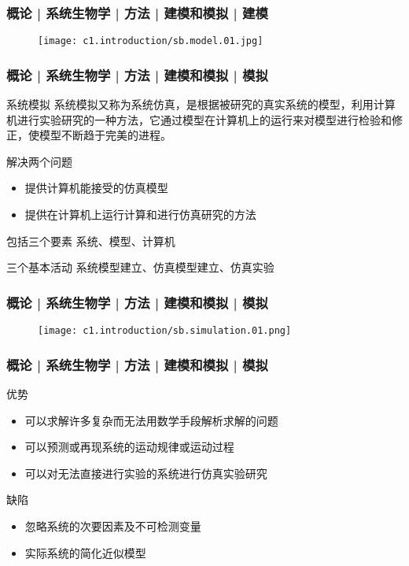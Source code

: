 \begin{frame}
  \frametitle{概论 | 系统生物学 | 方法 | 建模和模拟 | 建模}
  \begin{figure}
    \centering
    \texttt{[image: c1.introduction/sb.model.01.jpg]}
  \end{figure}
\end{frame}

\begin{frame}
  \frametitle{概论 | 系统生物学 | 方法 | 建模和模拟 | 模拟}
  \begin{block}{系统模拟}
系统模拟又称为系统仿真，是根据被研究的真实系统的模型，利用计算机进行实验研究的一种方法，它通过模型在计算机上的运行来对模型进行检验和修正，使模型不断趋于完美的进程。  
  \end{block}
  \pause
  \begin{block}{解决两个问题}
    \begin{itemize}
      \item 提供计算机能接受的仿真模型
      \item 提供在计算机上运行计算和进行仿真研究的方法
    \end{itemize}
  \end{block}
  \pause
  \begin{block}{包括三个要素}
      系统、模型、计算机
  \end{block}
  \pause
  \begin{block}{三个基本活动}
     系统模型建立、仿真模型建立、仿真实验
  \end{block}
\end{frame}

\begin{frame}
  \frametitle{概论 | 系统生物学 | 方法 | 建模和模拟 | 模拟}
  \begin{figure}
    \centering
    \texttt{[image: c1.introduction/sb.simulation.01.png]}
  \end{figure}
\end{frame}

\begin{frame}
  \frametitle{概论 | 系统生物学 | 方法 | 建模和模拟 | 模拟}
  \begin{block}{优势}
    \begin{itemize}
      \item 可以求解许多复杂而无法用数学手段解析求解的问题
      \item 可以预测或再现系统的运动规律或运动过程
      \item 可以对无法直接进行实验的系统进行仿真实验研究
    \end{itemize}
  \end{block}
  \pause
  \begin{block}{缺陷}
    \begin{itemize}
      \item 忽略系统的次要因素及不可检测变量
      \item 实际系统的简化近似模型
    \end{itemize}
  \end{block}
\end{frame}


